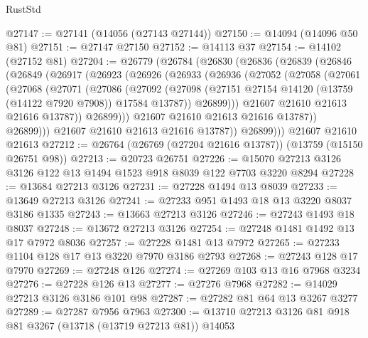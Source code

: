 \begin{lexlean}{RustStd}
\begin{coremodule}
@27147 := @27141 (@14056 (@27143 @27144))
@27150 := @14094 (@14096 @50 @81)
@27151 := @27147 @27150
@27152 := @14113 @37
@27154 := @14102 (@27152 @81)
@27204 := @26779
    (@26784
      (@26830
        (@26836
          (@26839
            (@26846
              (@26849
                (@26917
                  (@26923
                    (@26926
                      (@26933
                        (@26936
                          (@27052
                            (@27058
                              (@27061
                                (@27068
                                  (@27071
                                    (@27086
                                      (@27092
                                        (@27098
                                          (@27151
                                            @27154
                                            @14120
                                            (@13759 (@14122 @7920 @7908))
                                            @17584
                                            @13787))
                                        @26899)))
                                  @21607
                                  @21610
                                  @21613
                                  @21616
                                  @13787))
                              @26899)))
                        @21607
                        @21610
                        @21613
                        @21616
                        @13787))
                    @26899)))
              @21607
              @21610
              @21613
              @21616
              @13787))
          @26899)))
    @21607
    @21610
    @21613
@27212 := @26764 (@26769 (@27204 @21616 @13787)) (@13759 (@15150 @26751 @98))
@27213 := @20723 @26751
@27226 := @15070 @27213 @3126 @3126 @122 @13 @1494 @1523 @918 @8039 @122 @7703 @3220 @8294
@27228 := @13684 @27213 @3126
@27231 := @27228 @1494 @13 @8039
@27233 := @13649 @27213 @3126
@27241 := @27233 @951 @1493 @18 @13 @3220 @8037 @3186 @1335
@27243 := @13663 @27213 @3126
@27246 := @27243 @1493 @18 @8037
@27248 := @13672 @27213 @3126
@27254 := @27248 @1481 @1492 @13 @17 @7972 @8036
@27257 := @27228 @1481 @13 @7972
@27265 := @27233 @1104 @128 @17 @13 @3220 @7970 @3186 @2793
@27268 := @27243 @128 @17 @7970
@27269 := @27248 @126
@27274 := @27269 @103 @13 @16 @7968 @3234
@27276 := @27228 @126 @13
@27277 := @27276 @7968
@27282 := @14029 @27213 @3126 @3186 @101 @98
@27287 := @27282 @81 @64 @13 @3267 @3277
@27289 := @27287 @7956 @7963
@27300 := @13710 @27213 @3126 @81 @918 @81 @3267 (@13718 (@13719 @27213 @81)) @14053

\end{coremodule}
\end{lexlean}
